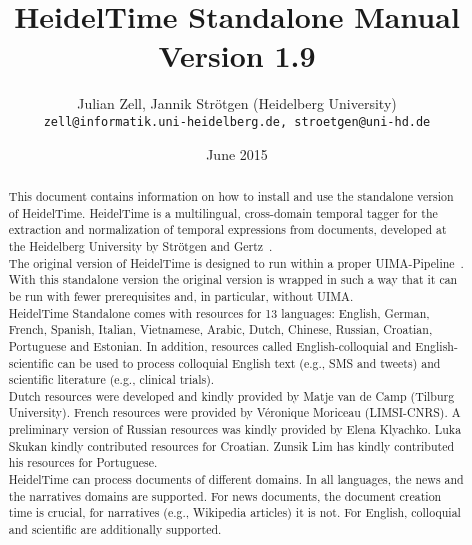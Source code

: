 \documentclass[
     11pt,         %
     a4paper,      %
     oneside,
     ]{article}
\newcommand{\languages}{English, German, French, Spanish, Italian, Vietnamese, Arabic, Dutch, Chinese, Russian, Croatian, Portuguese and Estonian}
\begin{document}
\title{%
HeidelTime Standalone Manual\\Version 1.9
}
\author{Julian Zell, Jannik Str\"otgen (Heidelberg University)\\[0.2em]
\small \texttt{zell@informatik.uni-heidelberg.de, stroetgen@uni-hd.de}
}
\date{June 2015}
\maketitle

\begin{abstract}
This document contains information on how to install and use the standalone version of HeidelTime. HeidelTime is a multilingual, cross-domain temporal tagger for the extraction and normalization of temporal expressions from documents, developed at the Heidelberg University by Str\"otgen and Gertz~\cite{StroetgenGertz2010_SemEval, HeidelTime, StroetgenGertz2013_LRE}.\\
The original version of HeidelTime is designed to run within a proper UIMA-Pipeline~\cite{UIMA}. With this standalone version the original version is wrapped in such a way that it can be run with fewer prerequisites and, in particular, without UIMA.\\
HeidelTime Standalone comes with resources for 13 languages: \languages. In addition, resources called English-colloquial and English-scientific can be used to process colloquial English text (e.g., SMS and tweets) and scientific literature (e.g., clinical trials). \\
Dutch resources were developed and kindly provided by Matje van de Camp (Tilburg University)\cite{CampChristiansen2012}. French resources were provided by Véronique Moriceau (LIMSI-CNRS)\cite{FrenchHeideltime}. A preliminary version of Russian resources was kindly provided by Elena Klyachko\cite{Elena}. Luka Skukan\cite{SkukanEtAl2014} kindly contributed resources for Croatian. Zunsik Lim\cite{ZunsikLim} has kindly contributed his resources for Portuguese. \\
HeidelTime can process documents of different domains. In all languages, the news and the narratives domains are supported. For news documents, the document creation time is crucial, for narratives (e.g., Wikipedia articles) it is not. For English, colloquial and scientific are additionally supported.
\end{abstract}

\newpage
\tableofcontents
\newpage





\end{document}

